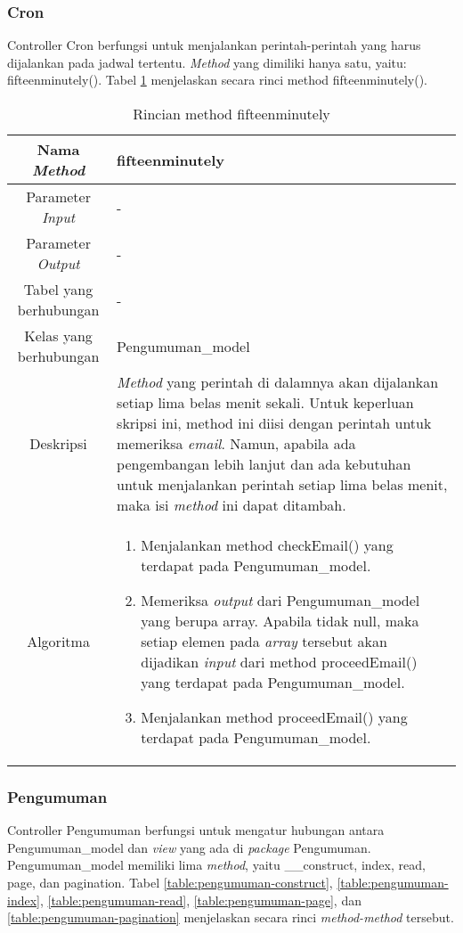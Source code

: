 \subsubsection{Cron}
Controller Cron berfungsi untuk menjalankan perintah-perintah yang harus dijalankan pada jadwal tertentu. \textit{Method} yang dimiliki hanya satu, yaitu: fifteenminutely(). Tabel \ref{table:cron-daily} menjelaskan secara rinci method fifteenminutely().

\begin{center}
	\begin{table}[H]
	\caption{Rincian method fifteenminutely}
	\label{table:cron-daily}
\begin{tabular}{|c|p{11cm}|}
\hline
Nama \textit{Method} 	& 	fifteenminutely 	\\
\hline
Parameter \textit{Input} & - \\
\hline
Parameter \textit{Output} & - \\
\hline
Tabel yang berhubungan & - \\
\hline
Kelas yang berhubungan & Pengumuman\_model \\
\hline
Deskripsi	& \textit{Method} yang perintah di dalamnya akan dijalankan setiap lima belas menit sekali. Untuk keperluan skripsi ini, method ini diisi dengan perintah untuk memeriksa \textit{email}. Namun, apabila ada pengembangan lebih lanjut dan ada kebutuhan untuk menjalankan perintah setiap lima belas menit, maka isi \textit{method} ini dapat ditambah.\\
\hline
Algoritma	& \begin{enumerate}
				\item Menjalankan method checkEmail() yang terdapat pada Pengumuman\_model.
				\item Memeriksa \textit{output} dari Pengumuman\_model yang berupa array. Apabila tidak null, maka setiap elemen pada \textit{array} tersebut akan dijadikan \textit{input} dari method proceedEmail() yang terdapat pada Pengumuman\_model.
				\item Menjalankan method proceedEmail() yang terdapat pada Pengumuman\_model.
				\end{enumerate} \\
\hline
\end{tabular}
\end{table}
\end{center}

\subsubsection{Pengumuman}
Controller Pengumuman berfungsi untuk mengatur hubungan antara Pengumuman\_model dan \textit{view} yang ada di \textit{package} Pengumuman. Pengumuman\_model memiliki lima \textit{method}, yaitu \_\_construct, index, read, page, dan pagination. Tabel \ref{table:pengumuman-construct}, \ref{table:pengumuman-index}, \ref{table:pengumuman-read}, \ref{table:pengumuman-page}, dan \ref{table:pengumuman-pagination} menjelaskan secara rinci \textit{method-method} tersebut.

